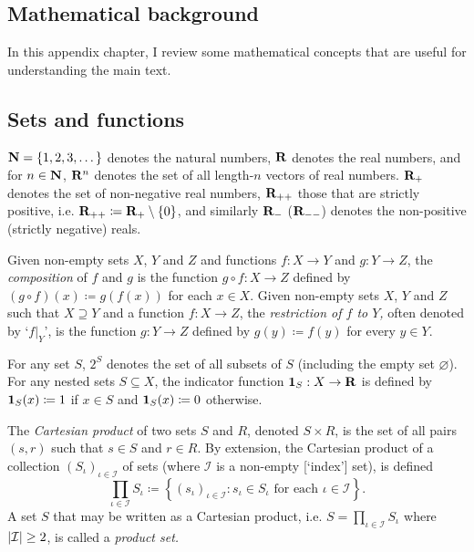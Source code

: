 \documentclass[11pt,letterpaper,reqno,oneside]{book}
\begin{document}
\begin{appendices}





\chapter{Mathematical background}
\label{math}

In this appendix chapter, I review some mathematical concepts that are useful for understanding the main text.



\section{Sets and functions}
\label{math:set}

$\mathbf{N} = \{1,2,3,\dots\}$ denotes the natural numbers, $\mathbf{R}$ denotes the real numbers, and for $n \in \mathbf{N}$, $\mathbf{R}^n$ denotes the set of all length-$n$ vectors of real numbers. $\mathbf{R}_+$ denotes the set of non-negative real numbers, $\mathbf{R}_{++}$ those that are strictly positive, i.e. $\mathbf{R}_{++} \coloneqq \mathbf{R}_+ \setminus \{0\}$, and similarly $\mathbf{R}_-$ ($\mathbf{R}_{--}$) denotes the non-positive (strictly negative) reals.

Given non-empty sets $X$, $Y$ and $Z$ and functions $f : X \to Y$ and $g : Y \to Z$, the \emph{composition} of $f$ and $g$ is the function $g \circ f : X \to Z$ defined by $(g \circ f)(x) \coloneqq g(f(x))$ for each $x \in X$. Given non-empty sets $X$, $Y$ and $Z$ such that $X \supseteq Y$ and a function $f : X \to Z$, the \emph{restriction of $f$ to $Y$,} often denoted by `$f|_Y$', is the function $g : Y \to Z$ defined by $g(y) \coloneqq f(y)$ for every $y \in Y$.

For any set $S$, $2^S$ denotes the set of all subsets of $S$ (including the empty set $\varnothing$). For any nested sets $S \subseteq X$, the indicator function $\boldsymbol{1}_S : X \to \mathbf{R}$ is defined by $\boldsymbol{1}_S(x) \coloneqq 1$ if $x \in S$ and $\boldsymbol{1}_S(x) \coloneqq 0$ otherwise.

The \emph{Cartesian product} of two sets $S$ and $R$, denoted $S \times R$, is the set of all pairs $(s,r)$ such that $s \in S$ and $r \in R$. By extension, the Cartesian product of a collection $(S_\iota)_{\iota \in \mathcal{I}}$ of sets (where $\mathcal{I}$ is a non-empty [`index'] set), is defined
%
\begin{equation*}
	\prod_{\iota \in \mathcal{I}} S_\iota
	\coloneqq \left\{
	(s_\iota)_{\iota \in \mathcal{I}} : 
	\text{$s_\iota \in S_\iota$ for each $\iota \in \mathcal{I}$}
	\right\} .
\end{equation*}
%
A set $S$ that may be written as a Cartesian product, i.e. $S = \prod_{\iota \in \mathcal{I}} S_\iota$ where $\abs*{\mathcal{I}} \geq 2$, is called a \emph{product set.}


\end{appendices}
\end{document}
